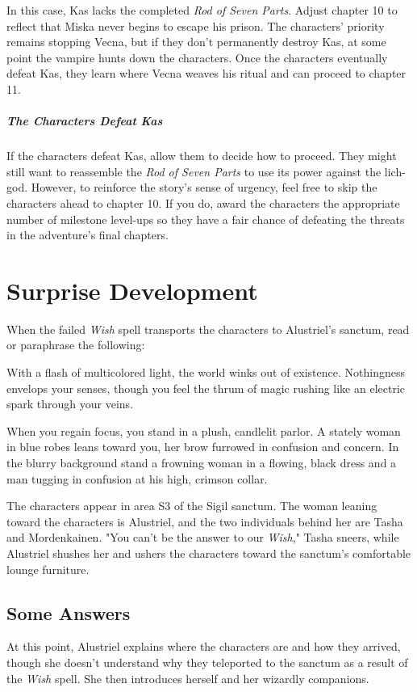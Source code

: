 \documentclass[10pt,a4paper,twoside,bg=print,twocolumn,openany,nodeprecatedcode]{dndbook}
\begin{document}
In this case, Kas lacks the completed \textit{Rod of Seven Parts}. Adjust chapter 10 to reflect that Miska never begins to escape his prison. The characters' priority remains stopping Vecna, but if they don't permanently destroy Kas, at some point the vampire hunts down the characters. Once the characters eventually defeat Kas, they learn where Vecna weaves his ritual and can proceed to chapter 11.

\subparagraph{The Characters Defeat Kas}
If the characters defeat Kas, allow them to decide how to proceed. They might still want to reassemble the \textit{Rod of Seven Parts} to use its power against the lich-god. However, to reinforce the story's sense of urgency, feel free to skip the characters ahead to chapter 10. If you do, award the characters the appropriate number of milestone level-ups so they have a fair chance of defeating the threats in the adventure's final chapters.

\section{Surprise Development}
When the failed \textit{Wish} spell transports the characters to Alustriel's sanctum, read or paraphrase the following:

\begin{DndReadAloud}{}
With a flash of multicolored light, the world winks out of existence. Nothingness envelops your senses, though you feel the thrum of magic rushing like an electric spark through your veins.

When you regain focus, you stand in a plush, candlelit parlor. A stately woman in blue robes leans toward you, her brow furrowed in confusion and concern. In the blurry background stand a frowning woman in a flowing, black dress and a man tugging in confusion at his high, crimson collar.

\end{DndReadAloud}

The characters appear in area S3 of the Sigil sanctum. The woman leaning toward the characters is Alustriel, and the two individuals behind her are Tasha and Mordenkainen. "You can't be the answer to our \textit{Wish}," Tasha sneers, while Alustriel shushes her and ushers the characters toward the sanctum's comfortable lounge furniture.

\subsection{Some Answers}
At this point, Alustriel explains where the characters are and how they arrived, though she doesn't understand why they teleported to the sanctum as a result of the \textit{Wish} spell. She then introduces herself and her wizardly companions.
\end{document}
